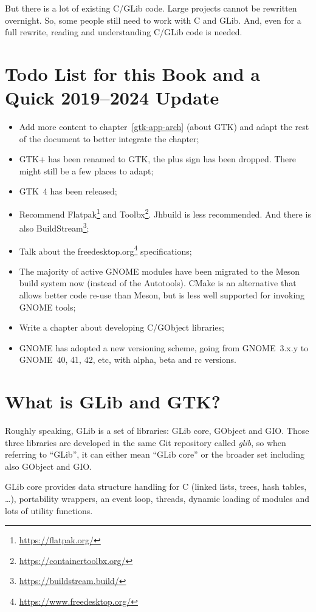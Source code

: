 But there is a lot of existing C/GLib code. Large projects cannot be rewritten overnight. So, some people still need to work with C and GLib. And, even for a full rewrite, reading and understanding C/GLib code is needed.

\section{Todo List for this Book and a Quick 2019--2024 Update}

\begin{itemize}
  \item Add more content to chapter~\ref{gtk-app-arch} (about GTK) and adapt the rest of the document to better integrate the chapter;
  \item GTK+ has been renamed to GTK, the plus sign has been dropped. There might still be a few places to adapt;
  \item GTK~4 has been released;
  \item Recommend Flatpak\footnote{\url{https://flatpak.org/}} and Toolbx\footnote{\url{https://containertoolbx.org/}}. Jhbuild is less recommended. And there is also BuildStream\footnote{\url{https://buildstream.build/}};
  \item Talk about the freedesktop.org\footnote{\url{https://www.freedesktop.org/}} specifications;
  \item The majority of active GNOME modules have been migrated to the Meson build system now (instead of the Autotools). CMake is an alternative that allows better code re-use than Meson, but is less well supported for invoking GNOME tools;
  \item Write a chapter about developing C/GObject libraries;
  \item GNOME has adopted a new versioning scheme, going from GNOME~3.x.y to GNOME~40, 41, 42, etc, with alpha, beta and rc versions.
\end{itemize}

\section{What is GLib and GTK?}

Roughly speaking, GLib is a set of libraries: GLib core, GObject and GIO. Those three libraries are developed in the same Git repository called \emph{glib}, so when referring to ``GLib'', it can either mean ``GLib core'' or the broader set including also GObject and GIO.

GLib core provides data structure handling for C (linked lists, trees, hash tables, …), portability wrappers, an event loop, threads, dynamic loading of modules and lots of utility functions.


